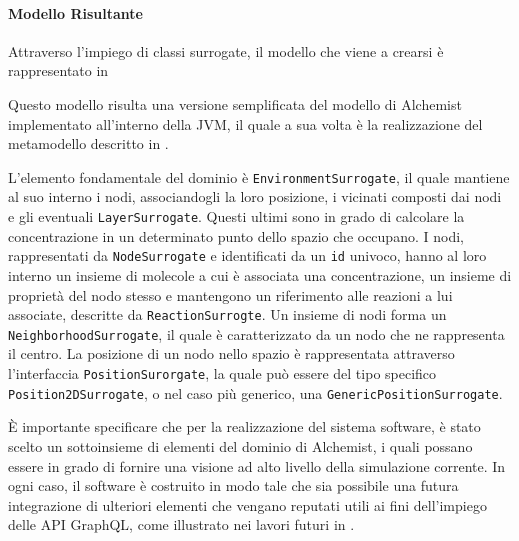 \paragraph{Modello Risultante}
Attraverso l'impiego di classi surrogate, il modello che viene a crearsi è rappresentato in 


Questo modello risulta una versione semplificata del modello di Alchemist implementato all'interno della \ac{JVM}, il quale a sua volta è la realizzazione del metamodello
descritto in .

L'elemento fondamentale del dominio è \texttt{EnvironmentSurrogate}, il quale mantiene al suo interno i nodi, associandogli la loro posizione, i vicinati composti dai nodi
e gli eventuali \texttt{LayerSurrogate}. Questi ultimi sono in grado di calcolare la concentrazione in un determinato punto dello spazio che occupano. I nodi, rappresentati
da \texttt{NodeSurrogate} e identificati da un \texttt{id} univoco, hanno al loro interno un insieme di molecole a cui è associata una concentrazione, un insieme di proprietà
del nodo stesso e mantengono un riferimento alle reazioni a lui associate, descritte da \texttt{ReactionSurrogte}. Un insieme di nodi forma un \texttt{NeighborhoodSurrogate},
il quale è caratterizzato da un nodo che ne rappresenta il centro. La posizione di un nodo nello spazio è rappresentata attraverso l'interfaccia \texttt{PositionSurorgate},
la quale può essere del tipo specifico \texttt{Position2DSurrogate}, o nel caso più generico, una \texttt{GenericPositionSurrogate}.

È importante specificare che per la realizzazione del sistema software, è stato scelto un sottoinsieme di elementi del dominio di Alchemist, i quali possano essere in grado
di fornire una visione ad alto livello della simulazione corrente. In ogni caso, il software è costruito in modo tale che sia possibile una futura integrazione di ulteriori
elementi che vengano reputati utili ai fini dell'impiego delle \ac{API} GraphQL, come illustrato nei lavori futuri in .

